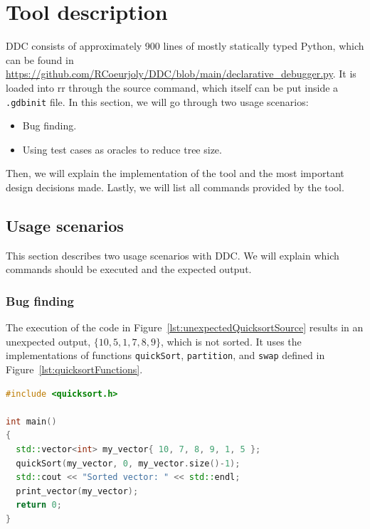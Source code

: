 \chapter{Tool description}
\label{cap:toolDescription}
DDC consists of approximately 900 lines of mostly statically typed Python, which can be found in \url{https://github.com/RCoeurjoly/DDC/blob/main/declarative_debugger.py}.
%
It is loaded into rr through the source command, which itself can be put inside a \verb|.gdbinit| file.
%
In this section, we will go through two usage scenarios:
\begin{itemize}
    \item Bug finding.
    \item Using test cases as oracles to reduce tree size.
\end{itemize}

Then, we will explain the implementation of the tool and the most important design decisions made. 
%
Lastly, we will list all commands provided by the tool.

\section{Usage scenarios}
This section describes two usage scenarios with DDC.
We will explain which commands should be executed and the expected output.

\subsection{Bug finding}
The execution of the code in Figure~\ref{lst:unexpectedQuicksortSource} results in an unexpected output, \(\{10, 5, 1, 7, 8, 9\}\), which is not sorted.
It uses the implementations of functions \verb|quickSort|, \verb|partition|, and \verb|swap| defined in Figure~\ref{lst:quicksortFunctions}.
\begin{lstlisting}[language=C++, caption={Code that results in unexpected output}, frame=tb, label={lst:unexpectedQuicksortSource}]
#include <quicksort.h>

int main()
{
  std::vector<int> my_vector{ 10, 7, 8, 9, 1, 5 };
  quickSort(my_vector, 0, my_vector.size()-1);
  std::cout << "Sorted vector: " << std::endl;
  print_vector(my_vector);
  return 0;
}
\end{lstlisting}

